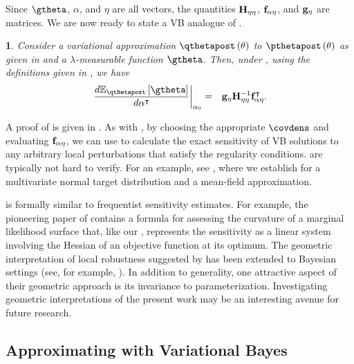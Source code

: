 \documentclass{article}\usepackage[]{graphicx}\usepackage[]{color}
\theoremstyle{definition}
\theoremstyle{plain}
\theoremstyle{plain}
\newtheorem{thm}{\protect\theoremname}
\theoremstyle{plain}
\theoremstyle{definition}
\theoremstyle{plain}
\theoremstyle{plain}
\providecommand{\theoremname}{Theorem}
\begin{document}
Since $\gtheta$, $\alpha$, and $\eta$ are all vectors, the quantities
$\mathbf{H}_{\eta\eta}$, $\mathbf{f}_{\alpha\eta}$, and $\mathbf{g}_{\eta}$ are matrices. We are now ready
to state a VB analogue of .
\begin{thm}
\label{thm:lrvb_formula}Consider a variational approximation
$\qthetapost\left(\theta\right)$
to $\pthetapost\left(\theta\right)$ as given in 
and a $\lambda$-measurable function $\gtheta$. Then, under \vbassum,
using the definitions given in , we
have
\begin{eqnarray}
\left.\frac{d\mbe_{\qthetapost}
    \left[\gtheta\right]}{d\alpha^{\trans}}\right|_{\alpha_{0}} & = &
    \eggrad\klhess^{-1}\efhess^{\trans}.\label{eq:lrvb_formula}
\end{eqnarray}
\end{thm}
A proof of  is given in .
As with , by choosing the appropriate $\covdens$
and evaluating $\mathbf{f}_{\alpha\eta}$, we can use 
to calculate the exact sensitivity of VB solutions to any arbitrary
local perturbations that satisfy the regularity conditions. \vbassum
are typically not hard to verify. For an example, see ,
where we establish \vbassum for a multivariate normal target
distribution and a mean-field approximation.

 is formally similar to frequentist sensitivity
estimates. For example, the pioneering paper of \citet{cook:1986:assessment}
contains a formula for assessing the curvature of a marginal likelihood surface
\citep[Equation 15]{cook:1986:assessment} that, like our
, represents the sensitivity as a linear system
involving the Hessian of an objective function at its optimum. The geometric
interpretation of local robustness suggested by \citet{cook:1986:assessment} has
been extended to Bayesian settings (see, for example,
\citet{zhu:2007:perturbation,zhu:2011:bayesian}). In addition to generality, one
attractive aspect of their geometric approach is its invariance to
parameterization. Investigating geometric interpretations of the present work
may be an interesting avenue for future research.





\subsection{Approximating with Variational Bayes}
\end{document}
